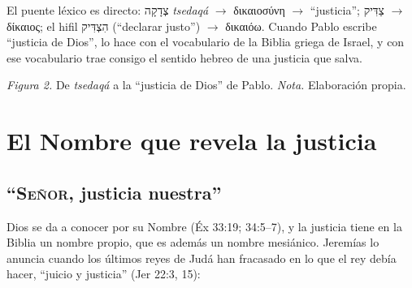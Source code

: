 \documentclass[11pt,letterpaper]{article}
\newcommand{\heb}[1]{\mbox{\foreignlanguage{hebrew}{#1}}}
\newcommand{\grc}[1]{\foreignlanguage{ancientgreek}{#1}}
\newcommand{\SENOR}{\textsc{Señor}}
\begin{document}
El puente léxico es directo: \heb{צְדָקָה} \emph{tsedaqá} $\rightarrow$ \grc{δικαιοσύνη} $\rightarrow$ ``justicia''; \heb{צַדִּיק} $\rightarrow$ \grc{δίκαιος}; el hifil \heb{הִצְדִּיק} (``declarar justo'') $\rightarrow$ \grc{δικαιόω}. Cuando Pablo escribe ``justicia de Dios'', lo hace con el vocabulario de la Biblia griega de Israel, y con ese vocabulario trae consigo el sentido hebreo de una justicia que salva.

\begin{center}
\par
{\footnotesize\color{gris}\textit{Figura 2.} De \emph{tsedaqá} a la ``justicia de Dios'' de Pablo. \textit{Nota.} Elaboración propia.}
\end{center}

\section{El Nombre que revela la justicia}

\subsection{``\SENOR, justicia nuestra''}
Dios se da a conocer por su Nombre (Éx 33:19; 34:5--7), y la justicia tiene en la Biblia un nombre propio, que es además un nombre mesiánico. Jeremías lo anuncia cuando los últimos reyes de Judá han fracasado en lo que el rey debía hacer, ``juicio y justicia'' (Jer 22:3, 15):
\end{document}
